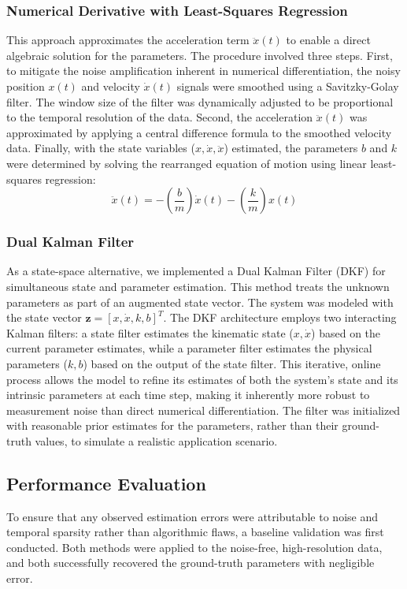\documentclass[]{article}
\begin{document}
\subsubsection{Numerical Derivative with Least-Squares Regression}
This approach approximates the acceleration term $\ddot{x}(t)$ to enable a direct algebraic solution for the parameters. The procedure involved three steps. First, to mitigate the noise amplification inherent in numerical differentiation, the noisy position $x(t)$ and velocity $\dot{x}(t)$ signals were smoothed using a Savitzky-Golay filter. The window size of the filter was dynamically adjusted to be proportional to the temporal resolution of the data. Second, the acceleration $\ddot{x}(t)$ was approximated by applying a central difference formula to the smoothed velocity data. Finally, with the state variables ($x, \dot{x}, \ddot{x}$) estimated, the parameters $b$ and $k$ were determined by solving the rearranged equation of motion using linear least-squares regression:
\begin{equation}
\ddot{x}(t) = - \left(\frac{b}{m}\right) \dot{x}(t) - \left(\frac{k}{m}\right) x(t)
\end{equation}

\subsubsection{Dual Kalman Filter}
As a state-space alternative, we implemented a Dual Kalman Filter (DKF) for simultaneous state and parameter estimation. This method treats the unknown parameters as part of an augmented state vector. The system was modeled with the state vector $\mathbf{z} = [x, \dot{x}, k, b]^T$. The DKF architecture employs two interacting Kalman filters: a state filter estimates the kinematic state ($x, \dot{x}$) based on the current parameter estimates, while a parameter filter estimates the physical parameters ($k, b$) based on the output of the state filter. This iterative, online process allows the model to refine its estimates of both the system's state and its intrinsic parameters at each time step, making it inherently more robust to measurement noise than direct numerical differentiation. The filter was initialized with reasonable prior estimates for the parameters, rather than their ground-truth values, to simulate a realistic application scenario.

\subsection{Performance Evaluation}
To ensure that any observed estimation errors were attributable to noise and temporal sparsity rather than algorithmic flaws, a baseline validation was first conducted. Both methods were applied to the noise-free, high-resolution data, and both successfully recovered the ground-truth parameters with negligible error.
\end{document}
